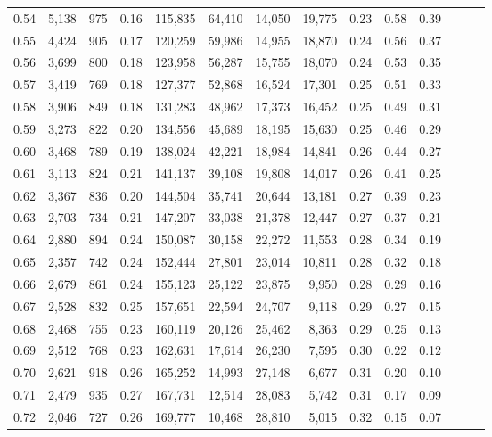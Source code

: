 \begin{tabular}{rrrrrrrrrrrrrr}
0.54 &  5,138 &    975 &  0.16 &  115,835 &   64,410 &  14,050 &  19,775 &  0.23 &  0.58 &      0.39 \\
0.55 &  4,424 &    905 &  0.17 &  120,259 &   59,986 &  14,955 &  18,870 &  0.24 &  0.56 &      0.37 \\
0.56 &  3,699 &    800 &  0.18 &  123,958 &   56,287 &  15,755 &  18,070 &  0.24 &  0.53 &      0.35 \\
0.57 &  3,419 &    769 &  0.18 &  127,377 &   52,868 &  16,524 &  17,301 &  0.25 &  0.51 &      0.33 \\
0.58 &  3,906 &    849 &  0.18 &  131,283 &   48,962 &  17,373 &  16,452 &  0.25 &  0.49 &      0.31 \\
0.59 &  3,273 &    822 &  0.20 &  134,556 &   45,689 &  18,195 &  15,630 &  0.25 &  0.46 &      0.29 \\
0.60 &  3,468 &    789 &  0.19 &  138,024 &   42,221 &  18,984 &  14,841 &  0.26 &  0.44 &      0.27 \\
0.61 &  3,113 &    824 &  0.21 &  141,137 &   39,108 &  19,808 &  14,017 &  0.26 &  0.41 &      0.25 \\
0.62 &  3,367 &    836 &  0.20 &  144,504 &   35,741 &  20,644 &  13,181 &  0.27 &  0.39 &      0.23 \\
0.63 &  2,703 &    734 &  0.21 &  147,207 &   33,038 &  21,378 &  12,447 &  0.27 &  0.37 &      0.21 \\
0.64 &  2,880 &    894 &  0.24 &  150,087 &   30,158 &  22,272 &  11,553 &  0.28 &  0.34 &      0.19 \\
0.65 &  2,357 &    742 &  0.24 &  152,444 &   27,801 &  23,014 &  10,811 &  0.28 &  0.32 &      0.18 \\
0.66 &  2,679 &    861 &  0.24 &  155,123 &   25,122 &  23,875 &   9,950 &  0.28 &  0.29 &      0.16 \\
0.67 &  2,528 &    832 &  0.25 &  157,651 &   22,594 &  24,707 &   9,118 &  0.29 &  0.27 &      0.15 \\
0.68 &  2,468 &    755 &  0.23 &  160,119 &   20,126 &  25,462 &   8,363 &  0.29 &  0.25 &      0.13 \\
0.69 &  2,512 &    768 &  0.23 &  162,631 &   17,614 &  26,230 &   7,595 &  0.30 &  0.22 &      0.12 \\
0.70 &  2,621 &    918 &  0.26 &  165,252 &   14,993 &  27,148 &   6,677 &  0.31 &  0.20 &      0.10 \\
0.71 &  2,479 &    935 &  0.27 &  167,731 &   12,514 &  28,083 &   5,742 &  0.31 &  0.17 &      0.09 \\
0.72 &  2,046 &    727 &  0.26 &  169,777 &   10,468 &  28,810 &   5,015 &  0.32 &  0.15 &      0.07 \\

\end{tabular}
